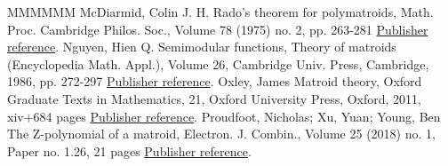 \begin{thebibliography}{MMMMMM}
 McDiarmid, Colin J. H. Rado’s theorem for polymatroids, Math. Proc. Cambridge Philos. Soc., Volume 78 (1975) no. 2, pp. 263-281 \href{https://alco.centre-mersenne.org/articles/10.5802/alco.447/#M75}{Publisher reference}.
 Nguyen, Hien Q. Semimodular functions, Theory of matroids (Encyclopedia Math. Appl.), Volume 26, Cambridge Univ. Press, Cambridge, 1986, pp. 272-297 \href{https://alco.centre-mersenne.org/articles/10.5802/alco.447/#N86}{Publisher reference}.
 Oxley, James Matroid theory, Oxford Graduate Texts in Mathematics, 21, Oxford University Press, Oxford, 2011, xiv+684 pages \href{https://alco.centre-mersenne.org/articles/10.5802/alco.447/#O11}{Publisher reference}.
 Proudfoot, Nicholas; Xu, Yuan; Young, Ben The Z-polynomial of a matroid, Electron. J. Combin., Volume 25 (2018) no. 1, Paper no. 1.26, 21 pages \href{https://alco.centre-mersenne.org/articles/10.5802/alco.447/#Zpoly}{Publisher reference}.
\end{thebibliography}
